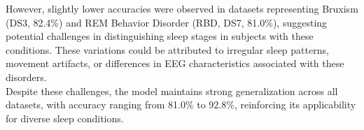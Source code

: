 However, slightly lower accuracies were observed in datasets representing Bruxism (DS3, 82.4\%) and REM Behavior Disorder (RBD, DS7, 81.0\%), suggesting potential challenges in distinguishing sleep stages in subjects with these conditions. These variations could be attributed to irregular sleep patterns, movement artifacts, or differences in EEG characteristics associated with these disorders.\\

Despite these challenges, the model maintains strong generalization across all datasets, with accuracy ranging from 81.0\% to 92.8\%, reinforcing its applicability for diverse sleep conditions. 